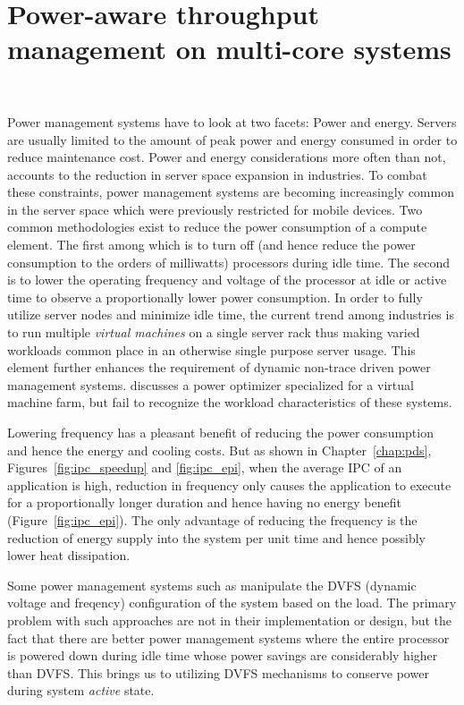 \chapter{Power-aware throughput management on multi-core systems}~\label{chap:delta}

Power management systems have to look at two facets: Power and energy. Servers are
usually limited to the amount of peak power and energy
consumed in order to reduce maintenance cost. Power and energy considerations more often than not, accounts 
to the reduction in server space expansion in industries. To combat these constraints, power management systems
are becoming increasingly common in the server space which were previously restricted for mobile devices.
Two common methodologies exist to reduce the power consumption of a compute element. The first among which
is to turn off (and hence reduce the power consumption to the orders of milliwatts) processors during idle time. 
The second is to lower the operating frequency and voltage of the processor at idle or active time to observe
a proportionally lower power consumption.
In order to fully utilize server nodes and minimize idle time, the current trend among industries is to 
run multiple \textit{virtual machines} on a single server rack thus making varied workloads common place
in an otherwise single purpose server usage. This element further enhances the requirement of 
dynamic non-trace driven power management systems. \cite{VirtualPower} discusses a power optimizer specialized
for a virtual machine farm, but fail to recognize the workload characteristics of these systems.

Lowering frequency has a pleasant benefit of reducing the power consumption and hence
the energy and cooling costs. But as shown in Chapter~\ref{chap:pds}, Figures~\ref{fig:ipc_speedup} 
and \ref{fig:ipc_epi}, when the average IPC of an application is high, reduction in 
frequency only causes the application to execute for a proportionally longer duration and 
hence having no energy benefit (Figure~\ref{fig:ipc_epi}). The only advantage of reducing
the frequency is the reduction of energy supply into the system per unit time and hence
possibly lower heat dissipation. 

Some power management systems such as \cite{OnDemand} manipulate the DVFS (dynamic voltage and freqency) configuration
of the system based on the load. The primary problem with such approaches are not in
their implementation or design, but the fact that there are better power management
systems where the entire processor is powered down during idle time whose power savings are considerably higher than DVFS. 
This brings us to utilizing DVFS mechanisms to conserve power during system \textit{active}
state. 

